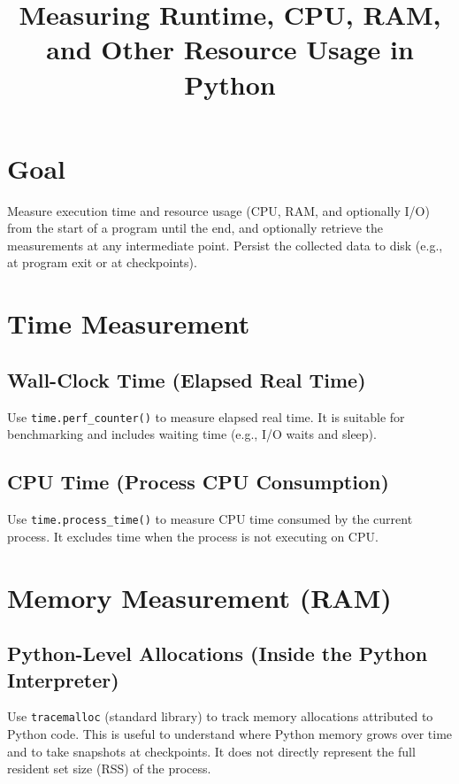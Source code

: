 \documentclass{article}
\title{Measuring Runtime, CPU, RAM, and Other Resource Usage in Python}
\date{}
\begin{document}
    \maketitle
    
    
    \section{Goal}
        Measure execution time and resource usage (CPU, RAM, and optionally I/O) from the start of a program until the end, and optionally retrieve the measurements at any intermediate point. Persist the collected data to disk (e.g., at program exit or at checkpoints).
    
    
    \section{Time Measurement}
        
        \subsection{Wall-Clock Time (Elapsed Real Time)}
            Use \texttt{time.perf\_counter()} to measure elapsed real time.
            It is suitable for benchmarking and includes waiting time (e.g., I/O waits and sleep).
        
        \subsection{CPU Time (Process CPU Consumption)}
            Use \texttt{time.process\_time()} to measure CPU time consumed by the current process.
            It excludes time when the process is not executing on CPU.
    
    
    \section{Memory Measurement (RAM)}
        
        \subsection{Python-Level Allocations (Inside the Python Interpreter)}
            Use \texttt{tracemalloc} (standard library) to track memory allocations attributed to Python code.
            This is useful to understand where Python memory grows over time and to take snapshots at checkpoints.
            It does not directly represent the full resident set size (RSS) of the process.
        
\end{document}
